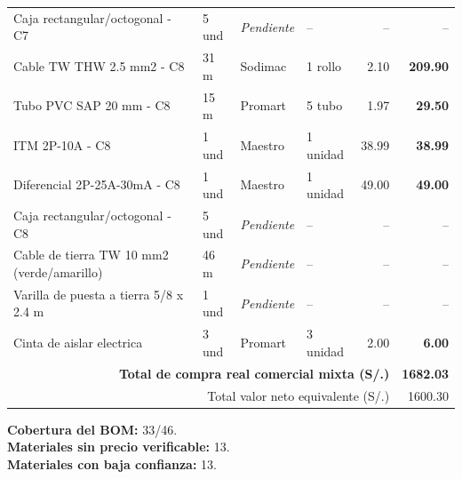 \begin{longtable}{p{5.0cm} p{1.5cm} p{2.2cm} p{2.2cm} r r}
Caja rectangular/octogonal - C7 & 5 und & \textit{Pendiente} & -- & -- & -- \\
Cable TW THW 2.5 mm2 - C8 & 31 m & Sodimac & 1 rollo & 2.10 & \textbf{209.90} \\
Tubo PVC SAP 20 mm - C8 & 15 m & Promart & 5 tubo & 1.97 & \textbf{29.50} \\
ITM 2P-10A - C8 & 1 und & Maestro & 1 unidad & 38.99 & \textbf{38.99} \\
Diferencial 2P-25A-30mA - C8 & 1 und & Maestro & 1 unidad & 49.00 & \textbf{49.00} \\
Caja rectangular/octogonal - C8 & 5 und & \textit{Pendiente} & -- & -- & -- \\
Cable de tierra TW 10 mm2 (verde/amarillo) & 46 m & \textit{Pendiente} & -- & -- & -- \\
Varilla de puesta a tierra 5/8 x 2.4 m & 1 und & \textit{Pendiente} & -- & -- & -- \\
Cinta de aislar electrica & 3 und & Promart & 3 unidad & 2.00 & \textbf{6.00} \\
\midrule
\multicolumn{5}{r}{\textbf{Total de compra real comercial mixta (S/.)}} & \textbf{1682.03} \\
\multicolumn{5}{r}{Total valor neto equivalente (S/.)} & 1600.30 \\
\bottomrule
\end{longtable}

\noindent\textbf{Cobertura del BOM:} 33/46.\\
\textbf{Materiales sin precio verificable:} 13.\\
\textbf{Materiales con baja confianza:} 13.
